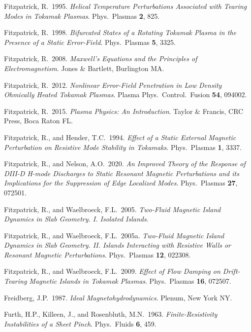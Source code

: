 \documentclass[notitlepage,12pt]{article}
\begin{document}
\begin{description}
\item Fitzpatrick, R.\ 1995. {\em Helical Temperature Perturbations Associated with Tearing Modes in Tokamak Plasmas}. Phys.\ Plasmas {\bf 2}, 825. 
\item Fitzpatrick, R.\ 1998. {\em Bifurcated States of a Rotating Tokamak Plasma in the Presence of a Static Error-Field}. Phys.\ Plasmas {\bf 5}, 3325. 
\item Fitzpatrick, R.\ 2008. {\em Maxwell's Equations and the Principles of Electromagnetism}. Jones \& Bartlett, Burlington MA.
\item Fitzpatrick, R.\ 2012. {\em Nonlinear Error-Field Penetration in Low Density Ohmically Heated Tokamak Plasmas}. Plasma Phys.\ Control.\ Fusion {\bf 54}, 094002.
\item Fitzpatrick, R.\ 2015. {\em Plasma Physics: An Introduction}. Taylor \& Francis, CRC Press, Boca Raton FL.
\item Fitzpatrick, R., and Hender, T.C.\ 1994. {\em Effect of a Static External Magnetic Perturbation on Resistive Mode Stability in Tokamaks}. Phys.\ Plasmas {\bf 1}, 3337. 
\item Fitzpatrick, R., and Nelson, A.O.\ 2020. {\em An Improved Theory of the Response of DIII-D H-mode Discharges to Static Resonant Magnetic Perturbations and its Implications for the Suppression of Edge Localized Modes}. Phys.\ Plasmas {\bf 27}, 072501.
\item Fitzpatrick, R., and Waelbroeck, F.L.\ 2005. {\em Two-Fluid Magnetic Island Dynamics in Slab Geometry. I. Isolated Islands}.
\item Fitzpatrick, R., and Waelbroeck, F.L.\ 2005a. {\em Two-Fluid Magnetic Island Dynamics in Slab Geometry. II. Islands Interacting with Resistive Walls or Resonant Magnetic Perturbations}.
Phys.\ Plasmas {\bf 12}, 022308. 
\item Fitzpatrick, R., and Waelbroeck, F.L.\ 2009. {\em Effect of Flow Damping on Drift-Tearing Magnetic Islands in Tokamak Plasmas}.
Phys.\ Plasmas {\bf 16}, 072507.
\item Freidberg, J.P.\ 1987. {\em Ideal Magnetohydrodynamics}. Plenum, New York NY. 
\item Furth, H.P., Killeen, J., and Rosenbluth, M.N.\ 1963. {\em Finite-Resistivity Instabilities of a Sheet Pinch}. Phys.\ Fluids {\bf 6}, 459.

\end{description}
\end{document}

